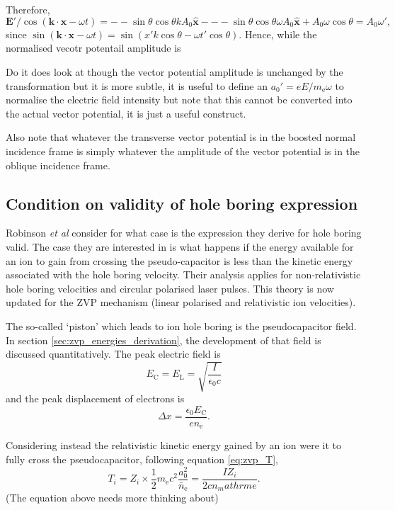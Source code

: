 Therefore,
\begin{equation}
	\mathbf{E}'/\cos(\mathbf{k}\cdot\mathbf{x} - \omega t) = --\sin\theta\cos\theta k A_0\hat{\mathbf{x}} --- \sin\theta\cos\theta \omega A_0\hat{\mathbf{x}} + A_0\omega\cos\theta = A_0\omega',
\end{equation}
since $\sin(\mathbf{k}\cdot\mathbf{x} - \omega t) = \sin(x'k\cos\theta-\omega t'\cos\theta)$. Hence, while the normalised vecotr potentail amplitude is 

Do it does look at though the vector potential amplitude is unchanged by the transformation but it is more subtle, it is useful to define an $a_0' = eE/m_\mathrm{e}\omega$ to normalise the electric field intensity but note that this cannot be converted into the actual vector potential, it is just a useful construct.

Also note that whatever the transverse vector potential is in the boosted normal incidence frame is simply whatever the amplitude of the vector potential is in the oblique incidence frame.


\subsection{Condition on validity of hole boring expression}
Robinson \textit{et al} \cite{robinsonHoleboringRadiationPressure2009} consider for what case is the expression they derive for hole boring valid. The case they are interested in is what happens if the energy available for an ion to gain from crossing the pseudo-capacitor is less than the kinetic energy associated with the hole boring velocity. Their analysis applies for non-relativistic hole boring velocities and circular polarised laser pulses. This theory is now updated for the ZVP mechanism (linear polarised and relativistic ion velocities).

The so-called `piston' which leads to ion hole boring is the pseudocapacitor field. In section \ref{sec:zvp_energies_derivation}, the development of that field is discussed quantitatively. The peak electric field is
\begin{equation}
	E_\mathrm{C} = E_\mathrm{L} = \sqrt{\frac{I}{\epsilon_0 c}}
\end{equation}
and the peak displacement of electrons is 
\begin{equation}
	\Delta x = \frac{\epsilon_0 E_\mathrm{C}}{en_\mathrm{e}}.
\end{equation}

Considering instead the relativistic kinetic energy gained by an ion were it to fully cross the pseudocapacitor, following equation \ref{eq:zvp_T},
\begin{equation}
	T_i = Z_i \times \frac{1}{2}m_\mathrm{e}c^2 \frac{a^2_0}{\bar{n}_\mathrm{e}} = \frac{IZ_i}{2cn_mathrm{e}}.
\end{equation}
(The equation above needs more thinking about)


